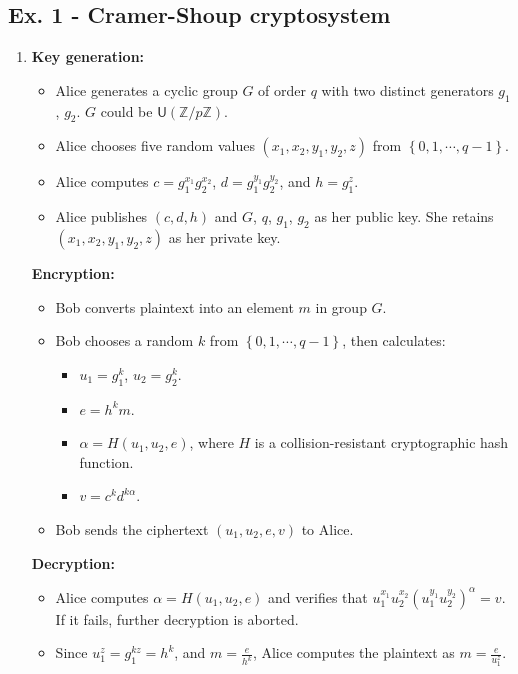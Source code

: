 \documentclass[11pt,a4paper]{article}
\begin{document}
\subsection*{Ex. 1 - Cramer-Shoup cryptosystem}
\begin{enumerate}
\item \textbf{Key generation:}
	\begin{itemize}
	\item Alice generates a cyclic group $G$ of order $q$ with two distinct generators $g_{1}$, $g_{2}$. $G$ could be $\mathsf{U}(\mathbb{Z}/p\mathbb{Z})$.
	\item Alice chooses five random values $\left( x_{1}, x_{2}, y_{1}, y_{2}, z \right)$ from $\left\lbrace 0, 1, \cdots, q-1 \right\rbrace$.
	\item Alice computes $c = g_{1}^{x_{1}}g_{2}^{x_{2}}$, $d = g_{1}^{y_{1}}g_{2}^{y_{2}}$, and $h = g_{1}^{z}$.
	\item Alice publishes $\left( c, d, h \right)$ and $G$, $q$, $g_{1}$, $g_{2}$ as her public key. She retains $\left( x_{1}, x_{2}, y_{1}, y_{2}, z \right)$ as her private key.
	\end{itemize}
\par \textbf{Encryption:}
	\begin{itemize}
	\item Bob converts plaintext into an element $m$ in group $G$.
	\item Bob chooses a random $k$ from $\left\lbrace 0, 1, \cdots, q-1 \right\rbrace$, then calculates:
		\begin{itemize}
		\item $u_{1} = g_{1}^{k}$, $u_{2} = g_{2}^{k}$.
		\item $e = h^{k}m$.
		\item $\alpha = H(u_{1}, u_{2}, e)$, where $H$ is a collision-resistant cryptographic hash function.
		\item $v = c^{k}d^{k\alpha}$.
		\end{itemize}
	\item Bob sends the ciphertext $\left( u_{1}, u_{2}, e, v \right)$ to Alice.
	\end{itemize}
\par \textbf{Decryption:}
	\begin{itemize}
		\item Alice computes $\alpha = H(u_{1}, u_{2}, e)$ and verifies that $u_{1}^{x_{1}}u_{2}^{x_{2}}(u_{1}^{y_{1}}u_{2}^{y_{2}})^{\alpha} = v$. If it fails, further decryption is aborted.
		\item Since $u_{1}^{z} = g_{1}^{kz} = h^{k}$, and $m = \frac{e}{h^{k}}$, Alice computes the plaintext as $m = \frac{e}{u_{1}^{z}}$.
	\end{itemize}


\end{enumerate}
\end{document}
